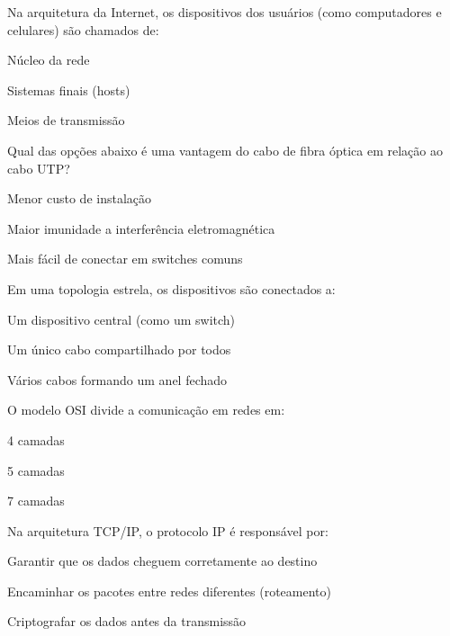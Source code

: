 \documentclass[12pt]{modelo/prova2}
\begin{document}
\maketitle

\question[0.5] Na arquitetura da Internet, os dispositivos dos usuários (como computadores e celulares) são chamados de:
\begin{choices}
\item Núcleo da rede
\item Sistemas finais (hosts)
\item Meios de transmissão
\end{choices}

\question[0.5] Qual das opções abaixo é uma vantagem do cabo de fibra óptica em relação ao cabo UTP?
\begin{choices}
\item Menor custo de instalação
\item Maior imunidade a interferência eletromagnética
\item Mais fácil de conectar em switches comuns
\end{choices}

\question[0.5] Em uma topologia estrela, os dispositivos são conectados a:
\begin{choices}
\item Um dispositivo central (como um switch)
\item Um único cabo compartilhado por todos
\item Vários cabos formando um anel fechado
\end{choices}

\question[0.5] O modelo OSI divide a comunicação em redes em:
\begin{choices}
\item 4 camadas
\item 5 camadas
\item 7 camadas
\end{choices}


\question[0.5] Na arquitetura TCP/IP, o protocolo IP é responsável por:
\begin{choices}
\item Garantir que os dados cheguem corretamente ao destino
\item Encaminhar os pacotes entre redes diferentes (roteamento)
\item Criptografar os dados antes da transmissão
\end{choices}
\end{document}
